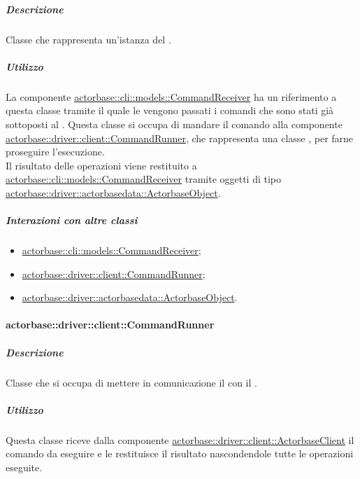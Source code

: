 \documentclass{scalatekids-article}
\begin{document}
\subparagraph{Descrizione}

Classe che rappresenta un'istanza del .

\subparagraph{Utilizzo}

La componente \hyperref[sec:actorbase::cli::models::CommandReceiver]{actorbase::cli::models::CommandReceiver}
ha un riferimento a questa classe tramite il quale le vengono passati
i comandi che sono stati già sottoposti al . Questa
classe si occupa di mandare il comando alla componente
\hyperref[sec:actorbase::driver::client::CommandRunner]{actorbase::driver::client::CommandRunner},
che rappresenta una classe , per farne proseguire l'esecuzione.\\
Il risultato delle operazioni viene restituito a \hyperref[sec:actorbase::cli::models::CommandReceiver]{actorbase::cli::models::CommandReceiver}
tramite oggetti di tipo \hyperref[sec:actorbase::driver::actorbasedata::ActorbaseObject]{actorbase::driver::actorbasedata::ActorbaseObject}.

\subparagraph{Interazioni con altre classi}

\begin{itemize}
\item \hyperref[sec:actorbase::cli::models::CommandReceiver]{actorbase::cli::models::CommandReceiver};
\item \hyperref[sec:actorbase::driver::client::CommandRunner]{actorbase::driver::client::CommandRunner};
\item \hyperref[sec:actorbase::driver::actorbasedata::ActorbaseObject]{actorbase::driver::actorbasedata::ActorbaseObject}.
\end{itemize}

\paragraph{actorbase::driver::client::CommandRunner}
\label{sec:actorbase::driver::client::CommandRunner}

\subparagraph{Descrizione}

Classe  che si occupa di mettere in comunicazione il
 con il .

\subparagraph{Utilizzo}

Questa classe riceve dalla componente \hyperref[sec:actorbase::driver::client::ActorbaseClient]{actorbase::driver::client::ActorbaseClient}
il comando da eseguire e le restituisce il risultato nascondendole
tutte le operazioni eseguite.
\end{document}
